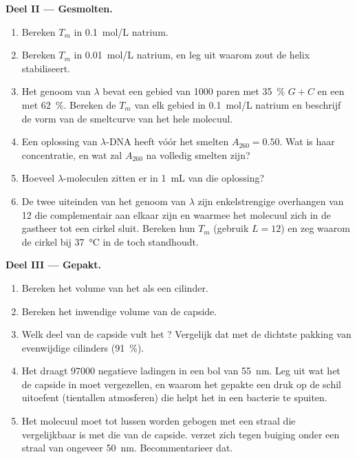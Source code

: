 \begin{problem}
\medskip
\noindent\textbf{Deel II --- Gesmolten.}
\begin{enumerate}[resume]
  \item Bereken $T_m$ in \qty{0.1}{mol/L} natrium.
  \item Bereken $T_m$ in \qty{0.01}{mol/L} natrium, en leg uit waarom zout
        de helix stabiliseert.
  \item Het genoom van $\lambda$ bevat een gebied van \qty{1000}{} paren
        met \qty{35}{\%} $G + C$ en een met \qty{62}{\%}. Bereken de $T_m$
        van elk gebied in \qty{0.1}{mol/L} natrium en beschrijf de vorm van
        de smeltcurve van het hele molecuul.
  \item Een oplossing van $\lambda$-DNA heeft vóór het smelten
        $A_{260} = 0.50$. Wat is haar concentratie, en wat zal $A_{260}$
        na volledig smelten zijn?
  \item Hoeveel $\lambda$-moleculen zitten er in \qty{1}{mL} van die
        oplossing?
  \item De twee uiteinden van het genoom van $\lambda$ zijn enkelstrengige
        overhangen van 12  die complementair aan elkaar zijn en
        waarmee het molecuul zich in de gastheer tot een cirkel sluit.
        Bereken hun $T_m$ (gebruik $L = 12$) en zeg waarom de cirkel bij
        \qty{37}{\celsius} in de  toch standhoudt.
\end{enumerate}

\medskip
\noindent\textbf{Deel III --- Gepakt.}
\begin{enumerate}[resume]
  \item Bereken het volume van het  als een cilinder.
  \item Bereken het inwendige volume van de capside.
  \item Welk deel van de capside vult het ? Vergelijk dat met de
        dichtste pakking van evenwijdige cilinders (\qty{91}{\%}).
  \item Het  draagt \num{97000} negatieve ladingen in een bol van
        \qty{55}{nm}. Leg uit wat het  de capside in moet vergezellen,
        en waarom het gepakte  een druk op de schil uitoefent (tientallen
        atmosferen) die helpt het in een bacterie te spuiten.
  \item Het molecuul moet tot lussen worden gebogen met een straal die
        vergelijkbaar is met die van de capside.  verzet zich tegen
        buiging onder een straal van ongeveer \qty{50}{nm}. Becommentarieer
        dat.
\end{enumerate}


\end{problem}
